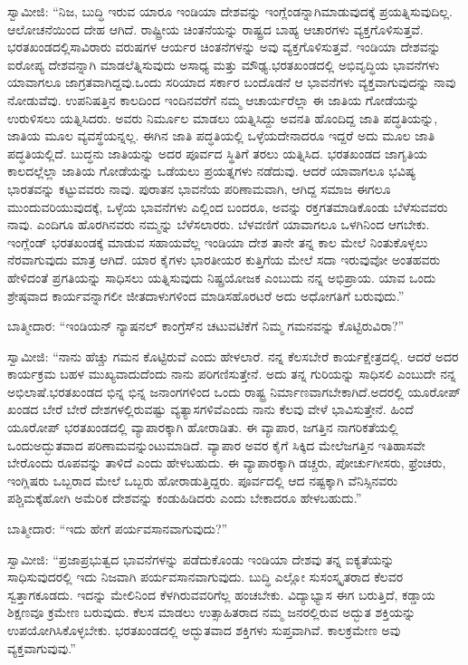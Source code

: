 ಸ್ವಾಮೀಜಿ: “ನಿಜ, ಬುದ್ಧಿ ಇರುವ ಯಾರೂ ಇಂಡಿಯಾ ದೇಶವನ್ನು ಇಂಗ್ಲೆಂಡನ್ನಾಗಿ\break ಮಾಡುವುದಕ್ಕೆ ಪ್ರಯತ್ನಿಸುವುದಿಲ್ಲ. ಆಲೋಚನೆಯಿಂದ ದೇಹ ಆಗಿದೆ. ರಾಷ್ಟ್ರೀಯ ಚಿಂತನೆಯನ್ನು ರಾಷ್ಟ್ರದ ಬಾಹ್ಯ ಆಚಾರಗಳು ವ್ಯಕ್ತಗೊಳಿಸುತ್ತವೆ. ಭರತಖಂಡದಲ್ಲಿ\break ಸಾವಿರಾರು ವರುಷಗಳ ಆರ್ಯರ ಚಿಂತನೆಗಳನ್ನು ಅವು ವ್ಯಕ್ತಗೊಳಿಸುತ್ತವೆ. ಇಂಡಿಯಾ ದೇಶವನ್ನು ಐರೋಪ್ಯ ದೇಶವನ್ನಾಗಿ ಮಾಡಲೆತ್ನಿಸುವುದು ಅಸಾಧ್ಯ ಮತ್ತು ಮೌಢ್ಯ.\break ಭರತಖಂಡದಲ್ಲಿ ಅಭಿವೃದ್ಧಿಯ ಭಾವನೆಗಳು ಯಾವಾಗಲೂ ಜಾಗ್ರತವಾಗಿದ್ದವು.\break ಒಂದು ಸರಿಯಾದ ಸರ್ಕಾರ ಬಂದೊಡನೆ ಆ ಭಾವನೆಗಳು ವ್ಯಕ್ತವಾಗುವುದನ್ನು ನಾವು ನೋಡುವೆವು. ಉಪನಿಷತ್ತಿನ ಕಾಲದಿಂದ ಇಂದಿನವರೆಗೆ ನಮ್ಮ ಆಚಾರ್ಯರೆಲ್ಲಾ ಈ ಜಾತಿಯ ಗೋಡೆಯನ್ನು ಉರುಳಿಸಲು ಯತ್ನಿಸಿದರು. ಅವರು ನಿರ್ಮೂಲ ಮಾಡಲು ಯತ್ನಿಸಿದ್ದು ಅವನತಿ ಹೊಂದಿದ್ದ ಜಾತಿ ಪದ್ಧತಿಯನ್ನು, ಜಾತಿಯ ಮೂಲ ವ್ಯವಸ್ಥೆಯನ್ನಲ್ಲ. ಈಗಿನ ಜಾತಿ ಪದ್ಧತಿಯಲ್ಲಿ ಒಳ್ಳೆಯದೇನಾದರೂ ಇದ್ದರೆ ಅದು ಮೂಲ ಜಾತಿ ಪದ್ಧತಿಯಲ್ಲಿದೆ. ಬುದ್ಧನು ಜಾತಿಯನ್ನು ಅದರ ಪೂರ್ವದ ಸ್ಥಿತಿಗೆ ತರಲು ಯತ್ನಿಸಿದ. ಭರತಖಂಡದ ಜಾಗೃತಿಯ ಕಾಲದಲ್ಲೆಲ್ಲಾ ಜಾತಿಯ ಗೋಡೆಯನ್ನು ಒಡೆಯಲು ಪ್ರಯತ್ನಗಳು ನಡೆದುವು. ಆದರೆ ಯಾವಾಗಲೂ ಭವಿಷ್ಯ ಭಾರತವನ್ನು ಕಟ್ಟುವವರು ನಾವು. ಪುರಾತನ ಭಾವನೆಯ ಪರಿಣಾಮವಾಗಿ, ಆಗಿದ್ದ ಸಮಾಜ ಈಗಲೂ ಮುಂದುವರಿಯುವುದಕ್ಕೆ, ಒಳ್ಳೆಯ ಭಾವನೆಗಳು ಎಲ್ಲಿಂದ ಬಂದರೂ, ಅವನ್ನು ರಕ್ತಗತಮಾಡಿಕೊಂಡು ಬೆಳೆಸುವವರು ನಾವು. ಎಂದಿಗೂ ಹೊರಗಿನವರು ನಮ್ಮನ್ನು ಬೆಳೆಸಲಾರರು. ಬೆಳವಣಿಗೆ ಯಾವಾಗಲೂ ಒಳಗಿನಿಂದ ಆಗಬೇಕು. ಇಂಗ್ಲೆಂಡ್​ ಭರತಖಂಡಕ್ಕೆ ಮಾಡುವ ಸಹಾಯವೆಲ್ಲ ಇಂಡಿಯಾ ದೇಶ ತಾನೇ ತನ್ನ ಕಾಲ ಮೇಲೆ ನಿಂತುಕೊಳ್ಳಲು ನೆರವಾಗುವುದು ಮಾತ್ರ ಆಗಿದೆ. ಯಾರ ಕೈಗಳು ಭಾರತೀಯರ ಕುತ್ತಿಗೆಯ ಮೇಲೆ ಸದಾ ಇರುವುವೋ ಅಂತಹವರು ಹೇಳಿದಂತೆ ಪ್ರಗತಿಯನ್ನು ಸಾಧಿಸಲು ಯತ್ನಿಸುವುದು ನಿಷ್ಪ್ರಯೋಜಕ ಎಂಬುದು ನನ್ನ ಅಭಿಪ್ರಾಯ. ಯಾವ ಒಂದು ಶ್ರೇಷ್ಠವಾದ ಕಾರ್ಯವನ್ನಾಗಲೀ ಜೀತದಾಳುಗಳಿಂದ ಮಾಡಿಸಹೊರಟರೆ ಅದು ಅಧೋಗತಿಗೆ ಬರುವುದು.”

ಬಾತ್ಮೀದಾರ: “ಇಂಡಿಯನ್​ ನ್ಯಾಷನಲ್​ ಕಾಂಗ್ರೆಸ್​ನ ಚಟುವಟಿಕೆಗೆ ನಿಮ್ಮ ಗಮನವನ್ನು ಕೊಟ್ಟಿರುವಿರಾ?”

ಸ್ವಾಮೀಜಿ: “ನಾನು ಹೆಚ್ಚು ಗಮನ ಕೊಟ್ಟಿರುವೆ ಎಂದು ಹೇಳಲಾರೆ. ನನ್ನ ಕೆಲಸ\break ಬೇರೆ ಕಾರ್ಯಕ್ಷೇತ್ರದಲ್ಲಿ. ಆದರೆ ಅದರ ಕಾರ್ಯಕ್ರಮ ಬಹಳ ಮುಖ್ಯವಾದುದೆಂದು ನಾನು ಪರಿಗಣಿಸುತ್ತೇನೆ. ಅದು ತನ್ನ ಗುರಿಯನ್ನು ಸಾಧಿಸಲಿ ಎಂಬುದೇ ನನ್ನ ಅಭಿಲಾಷೆ.\break ಭರತಖಂಡದ ಭಿನ್ನ ಭಿನ್ನ ಜನಾಂಗಗಳಿಂದ ಒಂದು ರಾಷ್ಟ್ರ ನಿರ್ಮಾಣವಾಗಬೇಕಾಗಿದೆ.\break ಅದರಲ್ಲಿ ಯೂರೋಪ್​ ಖಂಡದ ಬೇರೆ ಬೇರೆ ದೇಶಗಳಲ್ಲಿರುವಷ್ಟು ವ್ಯತ್ಯಾಸಗಳಿವೆ\break ಎಂದು ನಾನು ಕೆಲವು ವೇಳೆ ಭಾವಿಸುತ್ತೇನೆ. ಹಿಂದೆ ಯೂರೋಪ್​ ಭರತಖಂಡದಲ್ಲಿ ವ್ಯಾಪಾರಕ್ಕಾಗಿ ಹೋರಾಡಿತು. ಈ ವ್ಯಾಪಾರ, ಜಗತ್ತಿನ ನಾಗರಿಕತೆಯಲ್ಲಿ ಒಂದು\break ಅದ್ಭುತವಾದ ಪರಿಣಾಮವನ್ನುಂಟುಮಾಡಿದೆ. ವ್ಯಾಪಾರ ಅವರ ಕೈಗೆ ಸಿಕ್ಕಿದ ಮೇಲೆ\break ಜಗತ್ತಿನ ಇತಿಹಾಸವೇ ಬೇರೊಂದು ರೂಪವನ್ನು ತಾಳಿದೆ ಎಂದು ಹೇಳಬಹುದು. ಈ ವ್ಯಾಪಾರಕ್ಕಾಗಿ ಡಚ್ಚರು, ಪೋರ್ಚುಗೀಸರು, ಫ್ರೆಂಚರು, ಇಂಗ್ಲಿಷರು ಒಬ್ಬರಾದ ಮೇಲೆ ಒಬ್ಬರು ಹೋರಾಡುತ್ತಿದ್ದರು. ಪೂರ್ವದಲ್ಲಿ ಆದ ನಷ್ಟಕ್ಕಾಗಿ ವೆನಿಸ್ಸಿನವರು ಪಶ್ಚಿಮಕ್ಕೆ\break ಹೋಗಿ ಅಮೆರಿಕ ದೇಶವನ್ನು ಕಂಡುಹಿಡಿದರು ಎಂದು ಬೇಕಾದರೂ ಹೇಳಬಹುದು.”

ಬಾತ್ಮೀದಾರ: “ಇದು ಹೇಗೆ ಪರ್ಯವಸಾನವಾಗುವುದು?”

\eject

ಸ್ವಾಮೀಜಿ: “ಪ್ರಜಾಪ್ರಭುತ್ವದ ಭಾವನೆಗಳನ್ನು ಪಡೆದುಕೊಂಡು ಇಂಡಿಯಾ ದೇಶವು ತನ್ನ ಐಕ್ಯತೆಯನ್ನು ಸಾಧಿಸುವುದರಲ್ಲಿ ಇದು ನಿಜವಾಗಿ ಪರ್ಯವಸಾನವಾಗುವುದು. ಬುದ್ಧಿ ಎಲ್ಲೋ ಸುಸಂಸ್ಕೃತರಾದ ಕೆಲವರ ಸ್ವತ್ತಾಗಕೂಡದು. ಇದನ್ನು ಮೇಲಿನಿಂದ ಕೆಳಗಿರುವವರಿ\-ಗೆಲ್ಲ ಹಂಚಬೇಕು. ವಿದ್ಯಾಭ್ಯಾಸ ಈಗ ಬರುತ್ತಿದೆ, ಕಡ್ಡಾಯ ಶಿಕ್ಷಣವೂ ಕ್ರಮೇಣ ಬರುವುದು. ಕೆಲಸ ಮಾಡಲು ಉತ್ಸಾಹಿತರಾದ ನಮ್ಮ ಜನರಲ್ಲಿರುವ ಅದ್ಭುತ ಶಕ್ತಿಯನ್ನು ಉಪಯೋಗಿಸಿಕೊಳ್ಳಬೇಕು. ಭರತಖಂಡದಲ್ಲಿ ಅದ್ಭುತವಾದ ಶಕ್ತಿಗಳು ಸುಪ್ತವಾಗಿವೆ. ಕಾಲಕ್ರಮೇಣ ಅವು ವ್ಯಕ್ತವಾಗುವುವು.”

